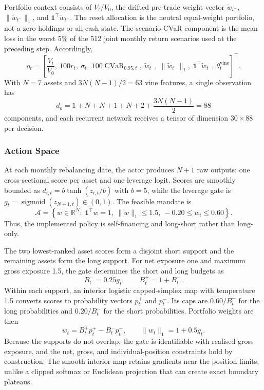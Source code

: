 Portfolio context consists of $V_t/V_0$, the drifted pre-trade weight vector $\widetilde w_{t^-}$, $\lVert\widetilde w_{t^-}\rVert_1$, and $\mathbf{1}^{\top}\widetilde w_{t^-}$. The reset allocation is the neutral equal-weight portfolio, not a zero-holdings or all-cash state. The scenario-CVaR component is the mean loss in the worst 5\% of the 512 joint monthly return scenarios used at the preceding step. Accordingly,
%
\begin{equation}
o_t=\left[\frac{V_t}{V_0},\ 100r_t,\ \sigma_t,\ 100\operatorname{CVaR}_{0.95,t},\ \widetilde w_{t^-},\ \lVert\widetilde w_{t^-}\rVert_1,\ \mathbf{1}^{\top}\widetilde w_{t^-},\ \theta^{\mathrm{vine}}_t\right]^{\top}.
\label{eq:state_vector}
\end{equation}
%
With $N=7$ assets and $3N(N-1)/2=63$ vine features, a single observation has
%
\begin{equation}
d_o=1+N+N+1+N+2+\frac{3N(N-1)}{2}=88
\label{eq:state_dimension}
\end{equation}
%
components, and each recurrent network receives a tensor of dimension $30\times88$ per decision.

\subsubsection{Action Space}
\label{subsubsec:3_action_space}

At each monthly rebalancing date, the actor produces $N+1$ raw outputs: one cross-sectional score per asset and one leverage logit. Scores are smoothly bounded as $d_{i,t}=b\tanh(z_{i,t}/b)$ with $b=5$, while the leverage gate is $g_t=\operatorname{sigmoid}(z_{N+1,t})\in(0,1)$. The feasible mandate is
%
\begin{equation}
\mathcal{A}=\left\{w\in\mathbb{R}^{N}:\ \mathbf{1}^{\top}w=1,\ \lVert w\rVert_1\leq1.5,\ -0.20\leq w_i\leq0.60\right\}.
\label{eq:action_space}
\end{equation}
%
Thus, the implemented policy is self-financing and long-short rather than long-only.

The two lowest-ranked asset scores form a disjoint short support and the remaining assets form the long support. For net exposure one and maximum gross exposure 1.5, the gate determines the short and long budgets as
%
\begin{equation}
B_t^- = 0.25g_t, \qquad B_t^+ = 1+B_t^-.
\label{eq:book_budgets}
\end{equation}
%
Within each support, an interior logistic capped-simplex map with temperature 1.5 converts scores to probability vectors $p_t^+$ and $p_t^-$. Its caps are $0.60/B_t^+$ for the long probabilities and $0.20/B_t^-$ for the short probabilities. Portfolio weights are then
%
\begin{equation}
w_t=B_t^+p_t^+-B_t^-p_t^-, \qquad
\lVert w_t\rVert_1=1+0.5g_t.
\label{eq:constrained_action_map}
\end{equation}
%
Because the supports do not overlap, the gate is identifiable with realised gross exposure, and the net, gross, and individual-position constraints hold by construction. The smooth interior map retains gradients near the position limits, unlike a clipped softmax or Euclidean projection that can create exact boundary plateaus.

